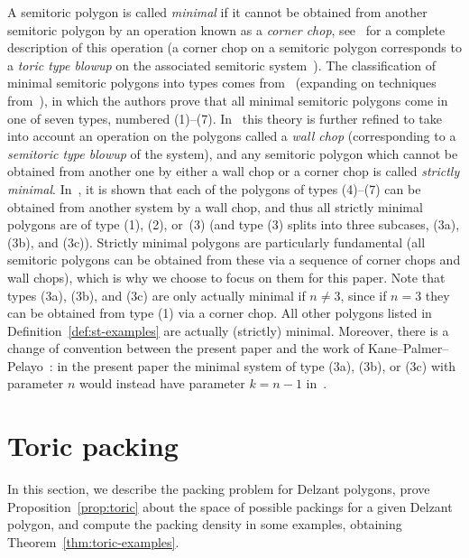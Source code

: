 \documentclass[pdftex]{sigma}
\numberwithin{equation}{section}
\begin{document}
\begin{Remark}\label{rmk:minimal}
 A semitoric polygon is called \emph{minimal} if it cannot be obtained from another semitoric polygon by an operation known as a \emph{corner chop}, see~\cite{KPP2018} for a complete description of this operation (a corner chop on a semitoric polygon corresponds to a \emph{toric type blowup} on the associated semitoric system~\cite[Section 4]{LFPal}).
 The classification of minimal semitoric polygons into types comes from~\cite{KPP2018} (expanding on techniques from~\cite{KPP2015}), in which the authors prove that all minimal semitoric polygons come in one of seven types, numbered (1)--(7).
 In~\cite{LFP-fam2} this theory is further refined to take into account an operation on the polygons called a \emph{wall chop} (corresponding to a \emph{semitoric type blowup} of the system), and any semitoric polygon which cannot be obtained from another one by either a wall chop or a corner chop is called \emph{strictly minimal}. In~\cite{LFP-fam2}, it is shown that each of the polygons of types (4)--(7) can be obtained from another system by a wall chop, and thus all strictly minimal polygons are of type (1), (2), or~(3) (and type (3) splits into three subcases, (3a), (3b), and (3c)).
 Strictly minimal polygons are particularly fundamental (all semitoric polygons can be obtained from these via a sequence of corner chops and wall chops), which is why we choose to focus on them for this paper.
 Note that types (3a), (3b), and (3c) are only actually minimal if $n\neq 3$, since if $n=3$ they can be obtained from type (1) via a corner chop. All other polygons listed in Definition~\ref{def:st-examples} are actually (strictly) minimal.
 Moreover, there is a change of convention between the present paper and the work of Kane--Palmer--Pelayo~\cite{KPP2018}: in the present paper the minimal system of type (3a), (3b), or (3c) with parameter $n$ would instead have parameter $k=n-1$ in~\cite{KPP2018}.
\end{Remark}

\section{Toric packing}\label{sec:toric}

In this section, we describe the packing problem for Delzant polygons, prove Proposition~\ref{prop:toric} about the space of possible packings for a given Delzant polygon, and compute the packing density in some examples, obtaining Theorem~\ref{thm:toric-examples}.
\end{document}
